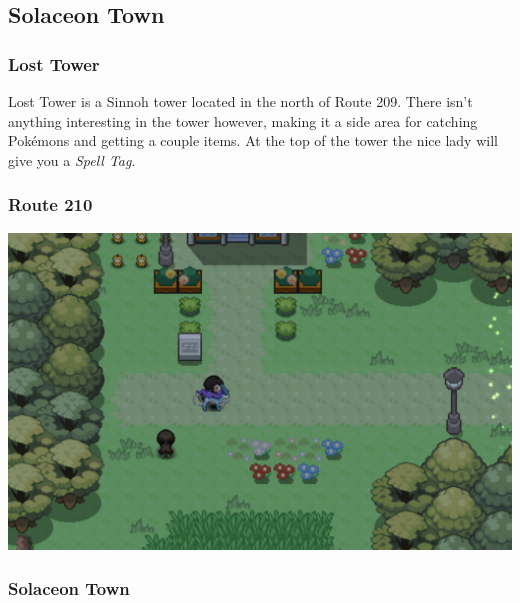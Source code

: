 \documentclass[11pt]{article}
\begin{document}
\subsection{Solaceon Town}\label{subsec:solaceon-town}

\subsubsection{Lost Tower}\label{subsubsec:lost_tower}

Lost Tower is a Sinnoh tower located in the north of Route 209.
There isn’t anything interesting in the tower however,
making it a side area for catching Pokémons and getting a couple items.
At the top of the tower the nice lady will give you a \emph{Spell Tag}.







\subsubsection{Route 210}\label{subsubsec:route_210}

\includegraphics[width=\textwidth]{walkthrough/Sinnoh/Route_210}




\subsubsection{Solaceon Town}\label{subsubsec:solaceon-town}
\end{document}
